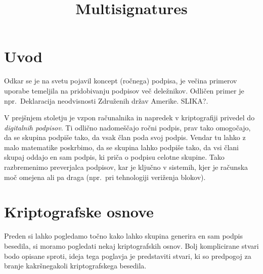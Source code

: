 \documentclass[isrm2, tisk]{fmfdelo}
\title{Multisignatures}
\begin{document}
\section{Uvod}
Odkar se je na svetu pojavil koncept (ročnega) podpisa, je večina primerov uporabe temeljila na
pridobivanju podpisov več deležnikov. Odličen primer je npr.\ Deklaracija neodvisnosti Združenih 
držav Amerike. SLIKA?. 

V prejšnjem stoletju je vzpon računalnika in napredek v kriptografiji privedel do \textit{digitalnih
podpisov}. Ti odlično nadomeščajo ročni podpis, prav tako omogočajo, da se skupina podpiše tako, 
da vsak član poda svoj podpis. Vendar tu lahko z malo matematike poskrbimo, da se skupina lahko 
podpiše tako, da vsi člani skupaj oddajo en sam podpis, ki priča o podpisu celotne skupine. Tako 
razbremenimo preverjalca podpisov, kar je ključno v sistemih, kjer je računska moč omejena ali 
pa draga (npr.\ pri tehnologiji veriženja blokov).

\section{Kriptografske osnove}
Preden si lahko pogledamo točno kako lahko skupina generira en sam podpis besedila, si moramo 
pogledati nekaj kriptografskih osnov. Bolj komplicirane stvari bodo opisane sproti, ideja tega 
poglavja je predstaviti stvari, ki so predpogoj za branje kakršnegakoli kriptografskega 
besedila.
\end{document}
